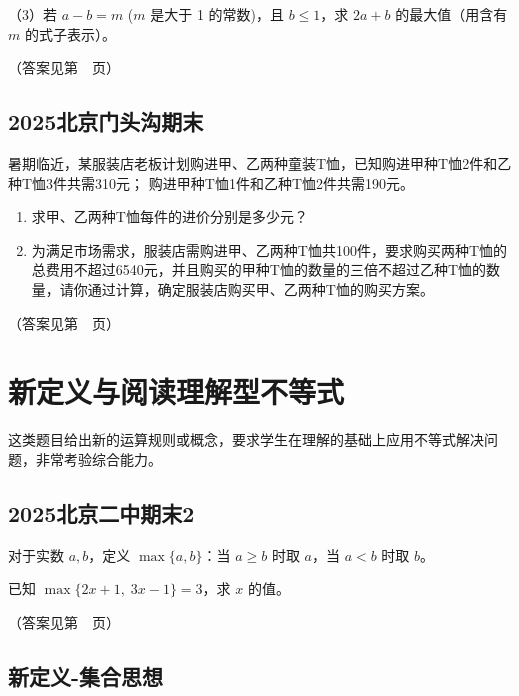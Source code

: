 （3）若 \(a-b=m\) (\(m\) 是大于 1 的常数)，且 \(b \leq 1\)，求 \(2a+b\) 的最大值（用含有 \(m\) 的式子表示）。
\vspace{5cm}


（答案见第~\pageref{不等式+最值问题-1}~页）



\subsection{2025北京门头沟期末}

暑期临近，某服装店老板计划购进甲、乙两种童装T恤，已知购进甲种T恤2件和乙种T恤3件共需310元；  
购进甲种T恤1件和乙种T恤2件共需190元。  

\begin{enumerate}
    \item 求甲、乙两种T恤每件的进价分别是多少元？  
    \vspace{5cm}
    \item 为满足市场需求，服装店需购进甲、乙两种T恤共100件，要求购买两种T恤的总费用不超过6540元，并且购买的甲种T恤的数量的三倍不超过乙种T恤的数量，请你通过计算，确定服装店购买甲、乙两种T恤的购买方案。
\end{enumerate}

\vspace{8cm}


（答案见第~\pageref{2025北京门头沟期末}~页）


\section{新定义与阅读理解型不等式}

这类题目给出新的运算规则或概念，要求学生在理解的基础上应用不等式解决问题，非常考验综合能力。

\subsection{2025北京二中期末2}

对于实数 \(a, b\)，定义 \(\max\{a, b\}\)：当 \(a \geq b\) 时取 \(a\)，当 \(a < b\) 时取 \(b\)。

已知 \(\max\{2x + 1,\; 3x - 1\} = 3\)，求 \(x\) 的值。


\vspace{4cm}

（答案见第~\pageref{2025北京二中期末2}~页）


\subsection{新定义-集合思想}

